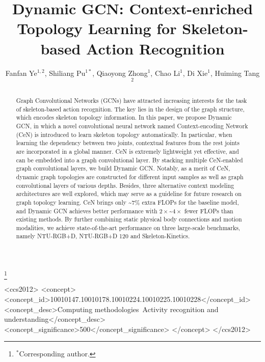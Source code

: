 \documentclass[sigconf]{acmart}
\begin{document}
\title{Dynamic GCN: Context-enriched Topology Learning for Skeleton-based Action Recognition}



\author{Fanfan Ye$^{1,2}$, Shiliang Pu$^{1\ast}$, Qiaoyong Zhong$^1$, Chao Li$^1$, Di Xie$^1$, Huiming Tang$^2$}
\thanks{$^\ast$Corresponding author.}



\renewcommand{\shortauthors}{Ye, Pu and Zhong, et al.}
\fancyhead{}  

\begin{abstract}
 Graph Convolutional Networks (GCNs) have attracted increasing interests for the task of skeleton-based action recognition. The key lies in the design of the graph structure, which encodes skeleton topology information. In this paper, we propose Dynamic GCN, in which a novel convolutional neural network named Context-encoding Network (CeN) is introduced to learn skeleton topology automatically. In particular, when learning the dependency between two joints, contextual features from the rest joints are incorporated in a global manner. CeN is extremely lightweight yet effective, and can be embedded into a graph convolutional layer. By stacking multiple CeN-enabled graph convolutional layers, we build Dynamic GCN. Notably, as a merit of CeN, dynamic graph topologies are constructed for different input samples as well as graph convolutional layers of various depths. Besides, three alternative context modeling architectures are well explored, which may serve as a guideline for future research on graph topology learning. CeN brings only \textasciitilde7\% extra FLOPs for the baseline model, and Dynamic GCN achieves better performance with $2\times$\textasciitilde$4\times$ fewer FLOPs than existing methods. By further combining static physical body connections and motion modalities, we achieve state-of-the-art performance on three large-scale benchmarks, namely NTU-RGB+D, NTU-RGB+D 120 and Skeleton-Kinetics.
\end{abstract}

\begin{CCSXML}
<ccs2012>
   <concept>
       <concept_id>10010147.10010178.10010224.10010225.10010228</concept_id>
       <concept_desc>Computing methodologies~Activity recognition and understanding</concept_desc>
       <concept_significance>500</concept_significance>
       </concept>
 </ccs2012>
\end{CCSXML}
\end{document}
